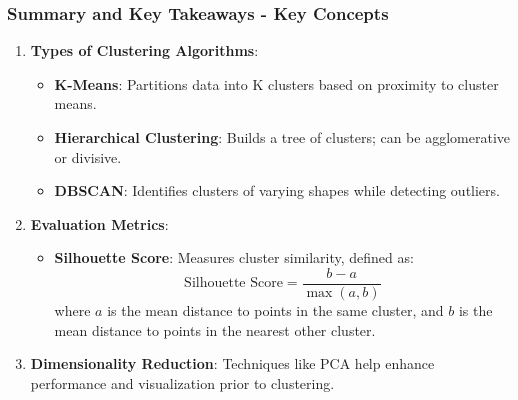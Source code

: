 \documentclass[aspectratio=169]{beamer}
\begin{document}
\begin{frame}[fragile]
    \frametitle{Summary and Key Takeaways - Key Concepts}
    \begin{enumerate}
        \item \textbf{Types of Clustering Algorithms}:
            \begin{itemize}
                \item \textbf{K-Means}: Partitions data into K clusters based on proximity to cluster means.
                \item \textbf{Hierarchical Clustering}: Builds a tree of clusters; can be agglomerative or divisive.
                \item \textbf{DBSCAN}: Identifies clusters of varying shapes while detecting outliers.
            \end{itemize}
        \item \textbf{Evaluation Metrics}:
            \begin{itemize}
                \item \textbf{Silhouette Score}: Measures cluster similarity, defined as:
                \begin{equation}
                    \text{Silhouette Score} = \frac{b - a}{\max(a, b)}
                \end{equation}
                where \(a\) is the mean distance to points in the same cluster, and \(b\) is the mean distance to points in the nearest other cluster.
            \end{itemize}
        \item \textbf{Dimensionality Reduction}: Techniques like PCA help enhance performance and visualization prior to clustering.
    \end{enumerate}
\end{frame}
\end{document}
